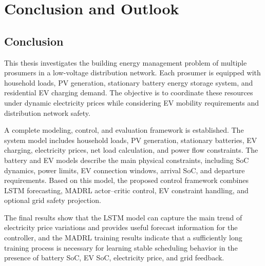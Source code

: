 ﻿%

\chapter{Conclusion and Outlook}\label{chapter:conclusion-outlook}

\section{Conclusion}

This thesis investigates the building energy management problem of multiple prosumers in a low-voltage distribution network. Each prosumer is equipped with household loads, PV generation, stationary battery energy storage system, and residential EV charging demand. The objective is to coordinate these resources under dynamic electricity prices while considering EV mobility requirements and distribution network safety.

A complete modeling, control, and evaluation framework is established. The system model includes household loads, PV generation, stationary batteries, EV charging, electricity prices, net load calculation, and power flow constraints. The battery and EV models describe the main physical constraints, including SoC dynamics, power limits, EV connection windows, arrival SoC, and departure requirements. Based on this model, the proposed control framework combines LSTM forecasting, MADRL actor--critic control, EV constraint handling, and optional grid safety projection.

The final results show that the LSTM model can capture the main trend of electricity price variations and provides useful forecast information for the controller, and the MADRL training results indicate that a sufficiently long training process is necessary for learning stable scheduling behavior in the presence of battery SoC, EV SoC, electricity price, and grid feedback.

